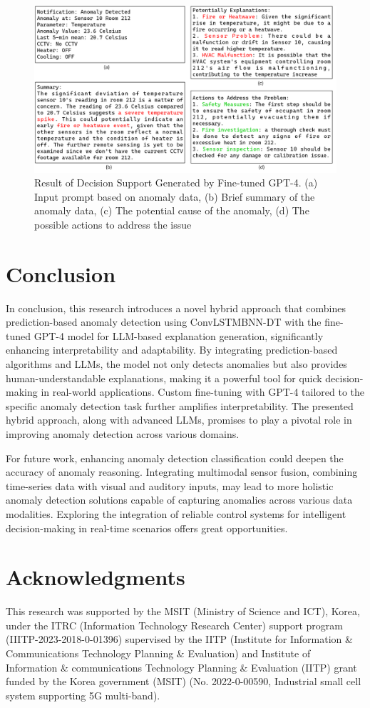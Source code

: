 \documentclass[final,3p,times,twocolumn]{elsarticle}
\begin{document}
\begin{figure}[t]
	\centering
	\includegraphics[width=12cm]{NLP} 
	\caption{Result of Decision Support Generated by Fine-tuned GPT-4. (a) Input prompt based on anomaly data, (b) Brief summary of the anomaly data, (c) The potential cause of the anomaly, (d) The possible actions to address the issue}\label{fig:NLP}
\end{figure}

\section{Conclusion}\label{sec5}
In conclusion, this research introduces a novel hybrid approach that combines prediction-based anomaly detection using ConvLSTMBNN-DT with the fine-tuned GPT-4 model for LLM-based explanation generation, significantly enhancing interpretability and adaptability. By integrating prediction-based algorithms and LLMs, the model not only detects anomalies but also provides human-understandable explanations, making it a powerful tool for quick decision-making in real-world applications. Custom fine-tuning with GPT-4 tailored to the specific anomaly detection task further amplifies interpretability. The presented hybrid approach, along with advanced LLMs, promises to play a pivotal role in improving anomaly detection across various domains.

For future work, enhancing anomaly detection classification could deepen the accuracy of anomaly reasoning. Integrating multimodal sensor fusion, combining time-series data with visual and auditory inputs, may lead to more holistic anomaly detection solutions capable of capturing anomalies across various data modalities. Exploring the integration of reliable control systems for intelligent decision-making in real-time scenarios offers great opportunities.

\section*{Acknowledgments}
This research was supported by the MSIT (Ministry of Science and ICT), Korea, under the ITRC (Information Technology Research Center) support program (IIITP-2023-2018-0-01396) supervised by the IITP (Institute for Information \& Communications Technology Planning \& Evaluation) and Institute of Information \& communications Technology Planning \& Evaluation (IITP) grant funded by the Korea government (MSIT) (No. 2022-0-00590, Industrial small cell system supporting 5G multi-band).
\end{document}
